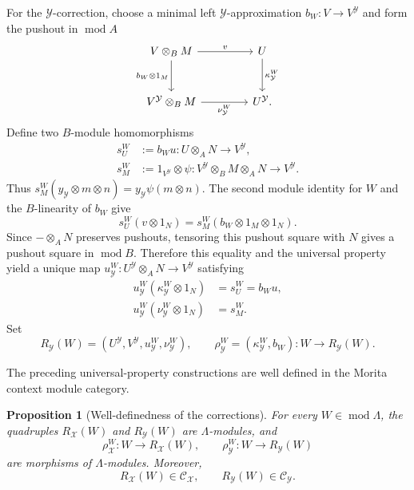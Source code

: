 \documentclass[11pt,reqno]{amsart}
\newtheorem{proposition}[theorem]{Proposition}
\theoremstyle{definition}
\theoremstyle{remark}
\newcommand{\modu}{\operatorname{mod}}
\numberwithin{equation}{section}
\begin{document}
For the $\mathcal Y$-correction, choose a minimal left
$\mathcal Y$-approximation $b_W:V\to V^{\mathcal Y}$ and form the pushout
in $\modu A$
\[
\begin{tikzcd}[column sep=4.2em,row sep=2.8em]
 V\otimes_BM \arrow[r,"v"]\arrow[d,"b_W\otimes1_M"']
 &U\arrow[d,"\kappa_{\mathcal Y}^W"]\\
 V^{\mathcal Y}\otimes_BM
 \arrow[r,"\nu_{\mathcal Y}^W"']&U^{\mathcal Y} .
\end{tikzcd}
\]
Define two $B$-module homomorphisms
\begin{align*}
 s_U^W&:=b_Wu:U\otimes_AN\longrightarrow V^{\mathcal Y},\\
 s_M^W&:=1_{V^{\mathcal Y}}\otimes\psi:
 V^{\mathcal Y}\otimes_BM\otimes_AN\longrightarrow V^{\mathcal Y}.
\end{align*}
Thus
$s_M^W(y_{\mathcal Y}\otimes m\otimes n)
=y_{\mathcal Y}\psi(m\otimes n)$.
The second module identity for $W$ and the $B$-linearity of $b_W$ give
\[
 s_U^W(v\otimes1_N)
 =s_M^W(b_W\otimes1_M\otimes1_N).
\]
Since $-\otimes_AN$ preserves pushouts, tensoring
this pushout square with $N$ gives a pushout square in $\modu B$.
Therefore this equality and the universal property yield a unique map
$u_{\mathcal Y}^W:U^{\mathcal Y}\otimes_AN\to V^{\mathcal Y}$ satisfying
\begin{align*}
 u_{\mathcal Y}^W(\kappa_{\mathcal Y}^W\otimes1_N)
 &=s_U^W=b_Wu,\\
 u_{\mathcal Y}^W(\nu_{\mathcal Y}^W\otimes1_N)
 &=s_M^W.
\end{align*}
Set
\[
 R_{\mathcal Y}(W)
 =(U^{\mathcal Y},V^{\mathcal Y},
   u_{\mathcal Y}^W,\nu_{\mathcal Y}^W),
 \qquad
 \rho_{\mathcal Y}^W=(\kappa_{\mathcal Y}^W,b_W):
 W\longrightarrow R_{\mathcal Y}(W).
\]

The preceding universal-property constructions are well defined in the
Morita context module category.

\begin{proposition}[Well-definedness of the corrections]
\label{prop:well-defined-corrections}
For every $W\in\modu\Lambda$, the quadruples
$R_{\mathcal X}(W)$ and $R_{\mathcal Y}(W)$ are $\Lambda$-modules, and
\[
 \rho_{\mathcal X}^W:W\longrightarrow R_{\mathcal X}(W),
 \qquad
 \rho_{\mathcal Y}^W:W\longrightarrow R_{\mathcal Y}(W)
\]
are morphisms of $\Lambda$-modules.  Moreover,
\[
 R_{\mathcal X}(W)\in\mathcal C_{\mathcal X},
 \qquad
 R_{\mathcal Y}(W)\in\mathcal C_{\mathcal Y}.
\]
\end{proposition}
\end{document}

